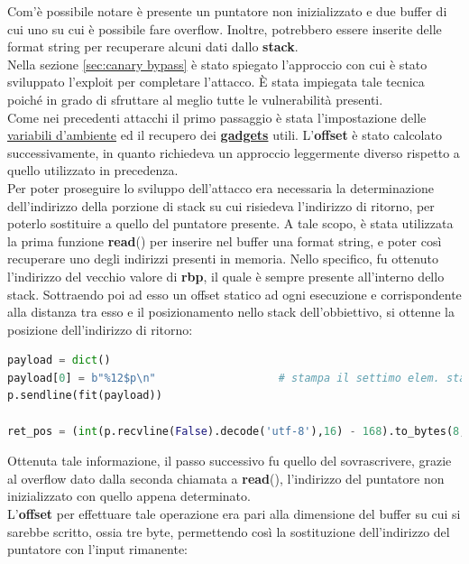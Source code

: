 Com'è possibile notare è presente un puntatore non inizializzato e due buffer di cui uno su cui è possibile fare overflow. Inoltre, potrebbero essere inserite delle format string per recuperare alcuni dati dallo \textbf{stack}.\\
Nella sezione \ref{sec:canary bypass} è stato spiegato l'approccio con cui è stato sviluppato l'exploit per completare l'attacco. È stata impiegata tale tecnica poiché in grado di sfruttare al meglio tutte le vulnerabilità presenti.\\
Come nei precedenti attacchi il primo passaggio è stata l'impostazione delle \hyperref[env]{variabili d'ambiente} ed il recupero dei \hyperref[gadgets]{\textbf{gadgets}} utili. L'\textbf{offset} è stato calcolato successivamente, in quanto richiedeva un approccio leggermente diverso rispetto
a quello utilizzato in precedenza.\\
Per poter proseguire lo sviluppo dell'attacco era necessaria la determinazione dell'indirizzo della porzione di stack su cui risiedeva l'indirizzo di ritorno, per poterlo sostituire a quello del puntatore presente.
A tale scopo, è stata utilizzata la prima funzione \textbf{read}() per inserire nel buffer una format string, e poter così recuperare uno degli indirizzi presenti in memoria. Nello specifico, fu ottenuto l'indirizzo del vecchio valore di \textbf{rbp}, il quale è sempre presente 
all'interno dello stack. Sottraendo poi ad esso un offset statico ad ogni esecuzione e corrispondente alla distanza tra esso e il posizionamento nello stack dell'obbiettivo, si ottenne la posizione dell'indirizzo di ritorno:
\begin{lstlisting}[language=Python, label=format-string, caption={Invio format string per stampare vecchio contenuto di \textbf{rbp} e calcolo della posizione nello stack dell'indirizzo di ritorno.}, style =Python]
payload = dict()              
payload[0] = b"%12$p\n"                   # stampa il settimo elem. stack : old rbp
p.sendline(fit(payload))            

ret_pos = (int(p.recvline(False).decode('utf-8'),16) - 168).to_bytes(8,'little') 
\end{lstlisting}
Ottenuta tale informazione, il passo successivo fu quello del sovrascrivere, grazie al overflow dato dalla seconda chiamata a \textbf{read}(), l'indirizzo del puntatore non inizializzato con quello appena determinato.\\
L'\textbf{offset} per effettuare tale operazione era pari alla dimensione del buffer su cui si sarebbe scritto, ossia tre byte, permettendo così la sostituzione dell'indirizzo del puntatore con l'input rimanente:

